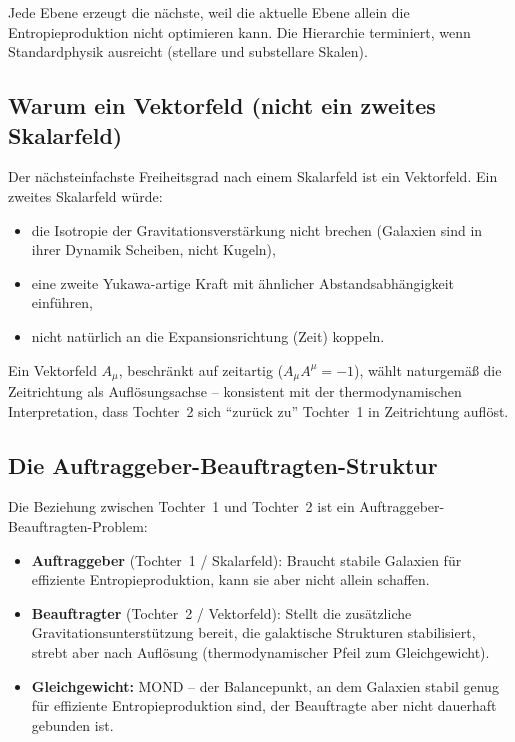 \documentclass[aps,prd,twocolumn,superscriptaddress,nofootinbib]{revtex4-2}
\begin{document}
Jede Ebene erzeugt die n\"achste, weil die aktuelle Ebene allein die Entropieproduktion nicht optimieren kann. Die Hierarchie terminiert, wenn Standardphysik ausreicht (stellare und substellare Skalen).

\subsection{Warum ein Vektorfeld (nicht ein zweites Skalarfeld)}
\label{sec:why_vector_not_scalar}

Der n\"achsteinfachste Freiheitsgrad nach einem Skalarfeld ist ein Vektorfeld. Ein zweites Skalarfeld w\"urde:
\begin{itemize}
\item die Isotropie der Gravitationsverst\"arkung nicht brechen (Galaxien sind in ihrer Dynamik Scheiben, nicht Kugeln),
\item eine zweite Yukawa-artige Kraft mit \"ahnlicher Abstandsabh\"angigkeit einf\"uhren,
\item nicht nat\"urlich an die Expansionsrichtung (Zeit) koppeln.
\end{itemize}

Ein Vektorfeld $A_\mu$, beschr\"ankt auf zeitartig ($A_\mu A^\mu = -1$), w\"ahlt naturgem\"a\ss{} die Zeitrichtung als Aufl\"osungsachse -- konsistent mit der thermodynamischen Interpretation, dass Tochter~2 sich ``zur\"uck zu'' Tochter~1 in Zeitrichtung aufl\"ost.

\subsection{Die Auftraggeber-Beauftragten-Struktur}
\label{sec:principal_agent}

Die Beziehung zwischen Tochter~1 und Tochter~2 ist ein Auftraggeber-Beauftragten-Problem:
\begin{itemize}
\item \textbf{Auftraggeber} (Tochter~1 / Skalarfeld): Braucht stabile Galaxien für effiziente Entropieproduktion, kann sie aber nicht allein schaffen.
\item \textbf{Beauftragter} (Tochter~2 / Vektorfeld): Stellt die zus\"atzliche Gravitationsunterst\"utzung bereit, die galaktische Strukturen stabilisiert, strebt aber nach Aufl\"osung (thermodynamischer Pfeil zum Gleichgewicht).
\item \textbf{Gleichgewicht:} MOND -- der Balancepunkt, an dem Galaxien stabil genug f\"ur effiziente Entropieproduktion sind, der Beauftragte aber nicht dauerhaft gebunden ist.
\end{itemize}
\end{document}
